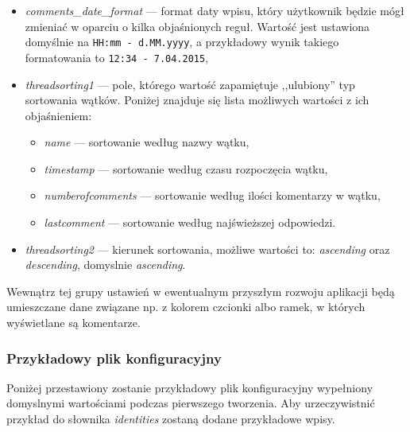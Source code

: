 \begin{itemize}[noitemsep]
  \item \emph{comments\_date\_format} --- format daty wpisu, który użytkownik będzie mógł zmieniać w oparciu o kilka objaśnionych reguł. Wartość jest ustawiona domyślnie na \texttt{HH:mm - d.MM.yyyy}, a przykładowy wynik takiego formatowania to \texttt{12:34 - 7.04.2015},
  \item \emph{threadsorting1} --- pole, którego wartość zapamiętuje ,,ulubiony'' typ sortowania wątków. Poniżej znajduje się lista możliwych wartości z ich objaśnieniem:
  
  \begin{itemize}[noitemsep]
    \item \emph{name} --- sortowanie według nazwy wątku,
    \item \emph{timestamp} --- sortowanie według czasu rozpoczęcia wątku,
    \item \emph{numberofcomments} --- sortowanie według ilości komentarzy w wątku,
    \item \emph{lastcomment} --- sortowanie według najświeższej odpowiedzi.
  \end{itemize}
  
  \item \emph{threadsorting2} --- kierunek sortowania, możliwe wartości to: \emph{ascending} oraz \emph{descending}, domyslnie \emph{ascending}.
\end{itemize}

Wewnątrz tej grupy ustawień w ewentualnym przyszłym rozwoju aplikacji będą umieszczane dane związane np. z kolorem czcionki albo ramek, w których wyświetlane są komentarze.

\subsubsection*{Przykładowy plik konfiguracyjny}

Poniżej przestawiony zostanie przykładowy plik konfiguracyjny wypełniony domyslnymi wartościami podczas pierwszego tworzenia. Aby urzeczywistnić przykład do słownika \emph{identities} zostaną dodane przykładowe wpisy.

